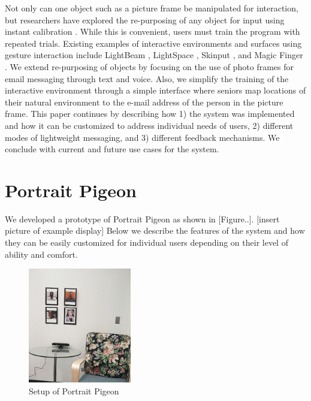 \documentclass{chi-ext}
\begin{document}
Not only can one object such as a picture frame be manipulated for interaction, but researchers have explored the re-purposing of any object for input using instant calibration \cite{Corsten2013}. While this is convenient, users must train the program with repeated trials. Existing examples of interactive environments and surfaces using gesture interaction include LightBeam \cite{Lightbeam2012}, LightSpace \cite{Wilson2010}, Skinput \cite{Harrison2010}, and Magic Finger \cite{Yang2012}. We extend re-purposing of objects by focusing on the use of photo frames for email messaging through text and voice. Also, we simplify the training of the interactive environment through a simple interface where seniors map locations of their natural environment to the e-mail address of the person in the picture frame. This paper continues by describing how 1) the system was implemented and how it can be customized to address individual needs of users, 2) different modes of lightweight messaging, and 3) different feedback mechanisms. We conclude with current and future use cases for the system. 


\section{Portrait Pigeon}
We developed a prototype of Portrait Pigeon as shown in [Figure..]. [insert picture of example display] Below we describe the features of the system and how they can be easily customized for individual users depending on their level of ability and comfort.

\begin{figure}
	\centering
	\includegraphics[width=0.4\textwidth]{photo-chair.JPG}
	\caption{Setup of Portrait Pigeon}
\end{figure}
\end{document}
